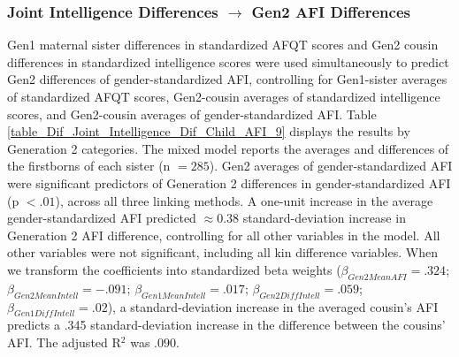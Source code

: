 \documentclass[a4paper,man,apacite,natbib,12pt,longtable]{apa6}\usepackage[]{graphicx}\usepackage[]{color}
\begin{document}
\subsubsection{Joint Intelligence Differences $\rightarrow$ Gen2 AFI Differences}
Gen1 maternal sister differences in standardized AFQT scores and Gen2 cousin differences in standardized intelligence scores were used simultaneously to predict Gen2 differences of gender-standardized AFI, controlling for Gen1-sister averages of standardized AFQT scores, Gen2-cousin averages of standardized intelligence scores, and Gen2-cousin averages of gender-standardized AFI. Table \ref{table_Dif_Joint_Intelligence_Dif_Child_AFI_9} displays the results by Generation 2 categories. The mixed model reports the averages and differences of the firstborns of each sister (n $= 285$). Gen2 averages of gender-standardized AFI were significant predictors of Generation 2 differences in gender-standardized AFI (p $< .01$), across all three linking methods. A one-unit increase in the average gender-standardized AFI predicted $\approx 0.38$ standard-deviation increase in Generation 2 AFI difference, controlling for all other variables in the model. All other variables were not significant, including all kin difference variables. When we transform the coefficients into standardized beta weights ($\beta_{Gen2 Mean AFI} = .324$; $\beta_{Gen2 Mean Intell} = -.091$; $\beta_{Gen1 Mean Intell} = .017$; $\beta_{Gen2 Diff Intell} = .059$; $\beta_{Gen1 Diff Intell} = .02$), a standard-deviation increase in the averaged cousin's AFI predicts a .345 standard-deviation increase in the difference between the cousins' AFI. The adjusted R$^{2}$ was $.090$.\\
\end{document}
